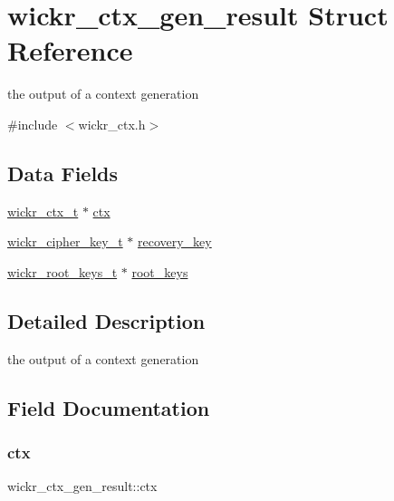 \hypertarget{structwickr__ctx__gen__result}{}\section{wickr\+\_\+ctx\+\_\+gen\+\_\+result Struct Reference}
\label{structwickr__ctx__gen__result}


the output of a context generation  




{\ttfamily \#include $<$wickr\+\_\+ctx.\+h$>$}

\subsection*{Data Fields}
\begin{DoxyCompactItemize}
\item 
\mbox{\hyperlink{structwickr__ctx}{wickr\+\_\+ctx\+\_\+t}} $\ast$ \mbox{\hyperlink{structwickr__ctx__gen__result_acf7a49dc829a76f122e2eb88e1ddf5aa}{ctx}}
\item 
\mbox{\hyperlink{structwickr__cipher__key}{wickr\+\_\+cipher\+\_\+key\+\_\+t}} $\ast$ \mbox{\hyperlink{structwickr__ctx__gen__result_a32feaf76def6c13abe0240c6ae669999}{recovery\+\_\+key}}
\item 
\mbox{\hyperlink{structwickr__root__keys}{wickr\+\_\+root\+\_\+keys\+\_\+t}} $\ast$ \mbox{\hyperlink{structwickr__ctx__gen__result_a42600241a65a968de4f84120d9031320}{root\+\_\+keys}}
\end{DoxyCompactItemize}


\subsection{Detailed Description}
the output of a context generation 

\subsection{Field Documentation}
\mbox{\label{structwickr__ctx__gen__result_acf7a49dc829a76f122e2eb88e1ddf5aa}} 
\subsubsection{\texorpdfstring{ctx}{ctx}}
{\footnotesize\ttfamily wickr\+\_\+ctx\+\_\+gen\+\_\+result\+::ctx}

